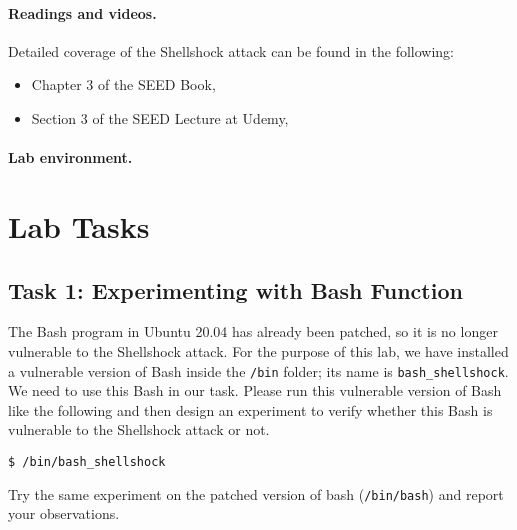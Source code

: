\paragraph{Readings and videos.}
Detailed coverage of the Shellshock attack can be found in the following:

\begin{itemize}
\item Chapter 3 of the SEED Book, \seedbook
\item Section 3 of the SEED Lecture at Udemy, \seedcsvideo
\end{itemize}


\paragraph{Lab environment.} \seedenvironmentB




\section{Lab Tasks}


\subsection{Task 1: Experimenting with Bash Function}


The Bash program in Ubuntu 20.04 has already been patched, so it is no
longer vulnerable to the Shellshock attack. For the purpose of this lab, we
have installed a vulnerable version of Bash inside the \texttt{/bin}
folder; its name is \texttt{bash\_shellshock}. We need to use 
this Bash in our task. Please run this vulnerable version of Bash like the
following and then design an experiment to verify whether this Bash is
vulnerable to the Shellshock attack or not. 

\begin{lstlisting}
$ /bin/bash_shellshock
\end{lstlisting}
 

Try the same experiment on the patched version of bash (\texttt{/bin/bash})
and report your observations.



